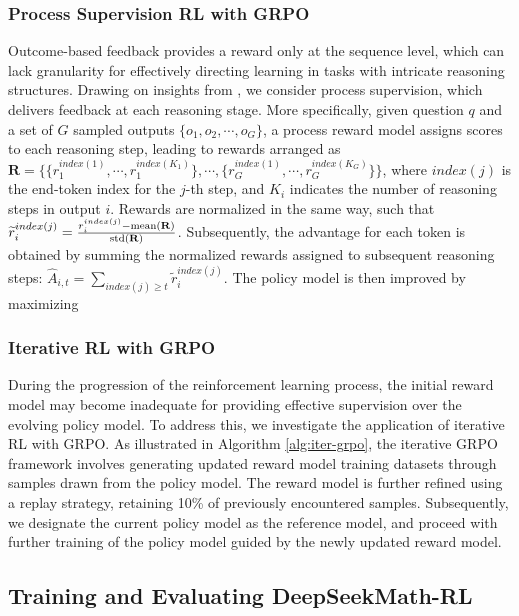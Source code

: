 \subsubsection{Process Supervision RL with GRPO} 
Outcome-based feedback provides a reward only at the sequence level, which can lack granularity for effectively directing learning in tasks with intricate reasoning structures. Drawing on insights from \cite{wang2023math}, we consider process supervision, which delivers feedback at each reasoning stage. More specifically, given question $q$ and a set of $G$ sampled outputs $\{o_1, o_2, \cdots, o_G\}$, a process reward model assigns scores to each reasoning step, leading to rewards arranged as $\mathbf{R} = \{ \{r_1^{index(1)},\cdots,r_1^{index(K_1)}\}, \cdots,  \{r_G^{index(1)},\cdots,r_G^{index(K_G)}\} \}$, where $index(j)$ is the end-token index for the $j$-th step, and $K_i$ indicates the number of reasoning steps in output $i$. Rewards are normalized in the same way, such that $\widetilde{r}_i^{index(j)} = \frac{r_i^{index(j)} - {\rm mean(\mathbf{R})}}{{\rm std(\mathbf{R})}}$.
Subsequently, the advantage for each token is obtained by summing the normalized rewards assigned to subsequent reasoning steps: $\hat{A}_{i, t} = \sum_{index(j) \ge t} \widetilde{r}_i^{index(j)}$.
The policy model is then improved by maximizing

\subsubsection{Iterative RL with GRPO} During the progression of the reinforcement learning process, the initial reward model may become inadequate for providing effective supervision over the evolving policy model. To address this, we investigate the application of iterative RL with GRPO. As illustrated in Algorithm \ref{alg:iter-grpo}, the iterative GRPO framework involves generating updated reward model training datasets through samples drawn from the policy model. The reward model is further refined using a replay strategy, retaining 10\% of previously encountered samples. Subsequently, we designate the current policy model as the reference model, and proceed with further training of the policy model guided by the newly updated reward model.

\subsection{Training and Evaluating DeepSeekMath-RL}

